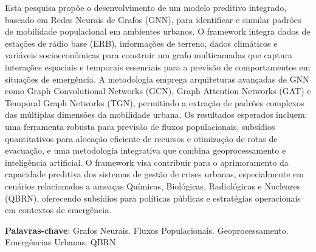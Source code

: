 \begin{resumo}
Esta pesquisa propõe o desenvolvimento de um modelo preditivo integrado, baseado em Redes Neurais de Grafos (GNN), para identificar e simular padrões de mobilidade populacional em ambientes urbanos. O framework integra dados de estações de rádio base (ERB), informações de terreno, dados climáticos e variáveis socioeconômicas para construir um grafo multicamadas que captura interações espaciais e temporais essenciais para a previsão de comportamentos em situações de emergência. A metodologia emprega arquiteturas avançadas de GNN como Graph Convolutional Networks (GCN), Graph Attention Networks (GAT) e Temporal Graph Networks (TGN), permitindo a extração de padrões complexos das múltiplas dimensões da mobilidade urbana. Os resultados esperados incluem: uma ferramenta robusta para previsão de fluxos populacionais, subsídios quantitativos para alocação eficiente de recursos e otimização de rotas de evacuação, e uma metodologia integrativa que combina geoprocessamento e inteligência artificial. O framework visa contribuir para o aprimoramento da capacidade preditiva dos sistemas de gestão de crises urbanas, especialmente em cenários relacionados a ameaças Químicas, Biológicas, Radiológicas e Nucleares (QBRN), oferecendo subsídios para políticas públicas e estratégias operacionais em contextos de emergência.

\vspace{\onelineskip}

\noindent
\textbf{Palavras-chave}: Grafos Neurais. Fluxos Populacionais. Geoprocessamento. Emergências Urbanas. QBRN.
\end{resumo}
